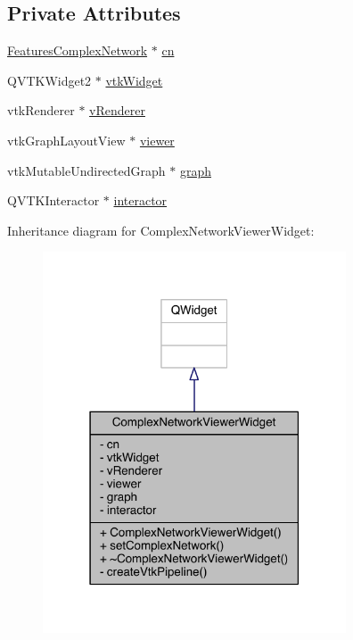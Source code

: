 \subsection*{Private Attributes}
\begin{DoxyCompactItemize}
\item 
\hyperlink{class_features_complex_network}{Features\+Complex\+Network} $\ast$ \hyperlink{class_complex_network_viewer_widget_a589b99afee6ab49d60e94922546c38fc}{cn}
\item 
Q\+V\+T\+K\+Widget2 $\ast$ \hyperlink{class_complex_network_viewer_widget_a3cc8ef618cd408d81e936c3a65e093cb}{vtk\+Widget}
\item 
vtk\+Renderer $\ast$ \hyperlink{class_complex_network_viewer_widget_a37cb73cbf45ace9c67986fb29c0d44d7}{v\+Renderer}
\item 
vtk\+Graph\+Layout\+View $\ast$ \hyperlink{class_complex_network_viewer_widget_aa9af3e2514822eb4c0fb42da84f33470}{viewer}
\item 
vtk\+Mutable\+Undirected\+Graph $\ast$ \hyperlink{class_complex_network_viewer_widget_a2ccd74a17620352941b4b19b97b20550}{graph}
\item 
Q\+V\+T\+K\+Interactor $\ast$ \hyperlink{class_complex_network_viewer_widget_a7d25bd2946c21efa67c5c216eecaf410}{interactor}
\end{DoxyCompactItemize}


Inheritance diagram for Complex\+Network\+Viewer\+Widget\+:\nopagebreak
\begin{figure}[H]
\begin{center}
\leavevmode
\includegraphics[width=255pt]{class_complex_network_viewer_widget__inherit__graph}
\end{center}
\end{figure}


